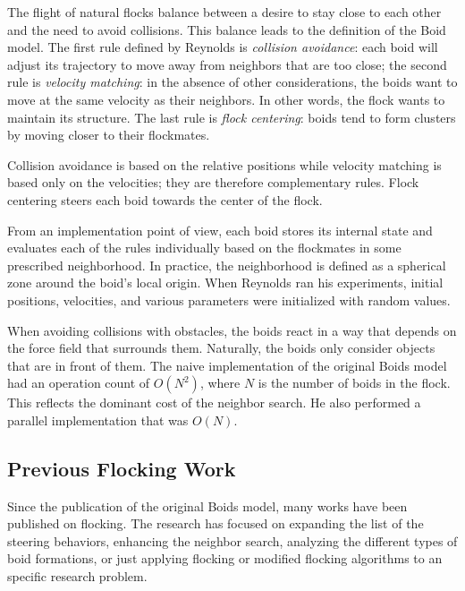 The flight of natural flocks balance between a desire to stay close to each other and the need to avoid collisions. This balance leads to the definition of the Boid model. The first rule defined by Reynolds is \textit{collision avoidance}: each boid will adjust its trajectory to move away from neighbors that are too close;  the second rule is \textit{velocity matching}: in the absence of other considerations, the boids want to move at the same velocity as their neighbors. In other words, the flock wants to maintain its structure. The last rule is \textit{flock centering}: boids tend to form clusters by moving closer to their flockmates. 

Collision avoidance is based on the relative positions while velocity matching is based only on the velocities; they are therefore complementary rules. Flock centering steers each boid towards the center of the flock. 

From an implementation point of view, each boid stores its internal state and evaluates each of the rules individually based on the flockmates in some prescribed neighborhood. In practice, the neighborhood is defined as a spherical zone around the boid's local origin. When Reynolds ran his experiments, initial positions, velocities, and various parameters were initialized with random values. 

When avoiding collisions with obstacles, the boids react in a way that depends on the force field that surrounds them. Naturally, the boids only consider objects that are in front of them. The naive implementation of the original Boids model had an operation count of $O(N^2)$, where $N$ is the number of boids in the flock. This reflects the dominant cost of the neighbor search. He also performed a parallel implementation that was $O(N)$.

\subsection{Previous Flocking Work}\label{currentwork}
Since the publication of the original Boids model, many works have been published on flocking. The research has focused on expanding the list of the steering behaviors\cite{craigSteeringBehaviors}, enhancing the neighbor search\cite{spatialSwarms}, analyzing the different types of  boid formations\cite{lineFormations}, or just applying flocking or modified flocking algorithms to an specific research problem.

